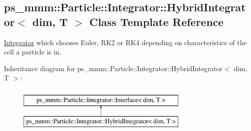 \hypertarget{classps__mmm_1_1_particle_1_1_integrator_1_1_hybrid_integrator}{}\subsection{ps\+\_\+mmm\+:\+:Particle\+:\+:Integrator\+:\+:Hybrid\+Integrator$<$ dim, T $>$ Class Template Reference}
\label{classps__mmm_1_1_particle_1_1_integrator_1_1_hybrid_integrator}


\hyperlink{namespaceps__mmm_1_1_particle_1_1_integrator}{Integrator} which chooses Euler, R\+K2 or R\+K4 depending on characteristics of the cell a particle is in.  


Inheritance diagram for ps\+\_\+mmm\+:\+:Particle\+:\+:Integrator\+:\+:Hybrid\+Integrator$<$ dim, T $>$\+:\begin{figure}[H]
\begin{center}
\leavevmode
\includegraphics[height=2.000000cm]{classps__mmm_1_1_particle_1_1_integrator_1_1_hybrid_integrator}
\end{center}
\end{figure}
